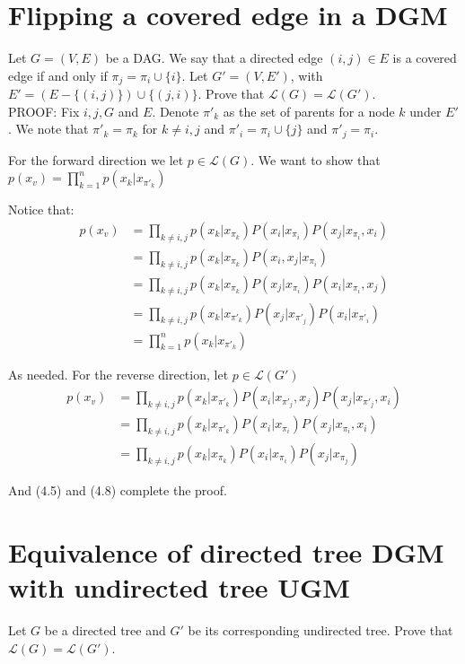 \documentclass[paper=a4, fontsize=11pt]{scrartcl} %
\numberwithin{equation}{section} %
\numberwithin{figure}{section} %
\numberwithin{table}{section} %
\begin{document}
\section{Flipping a covered edge in a DGM}
Let $G = (V, E)$ be a DAG. We say that a directed edge $(i, j) \in E$ is a covered edge if and only
if $\pi_j = \pi_i \cup \{i\}$. Let $G' = (V, E')$, with $E' = (E-\{(i, j)\}) \cup \{(j, i)\}$. Prove that $\mathcal{L}(G) = \mathcal{L}(G')$.
\\

PROOF: Fix $i,j, G$ and $E$. Denote \(\pi'_k\) as the set of parents for a node $k$ under $E'$. We note that \(\pi'_k = \pi_k\) for \(k\ne i,j\) and \(\pi'_i = \pi_i \cup \{j\}\) and \(\pi'_j = \pi_i\).

For the forward direction we let $p \in \mathcal{L}(G)$. 
We want to show that \(p(x_v)=\prod_{k=1}^{n}p(x_k|x_{\pi'_k})\)

Notice that: 
\begin{align}
p(x_v)&=\prod_{k\ne i,j}p(x_k|x_{\pi_k})P(x_i|x_{\pi_i})P(x_j|x_{\pi_i}, x_i) \\
&= \prod_{k\ne i,j}p(x_k|x_{\pi_k})P(x_i, x_j|x_{\pi_i}) \\
&= \prod_{k\ne i,j}p(x_k|x_{\pi_k})P(x_j|x_{\pi_i})P(x_i|x_{\pi_i}, x_j) \\
&= \prod_{k\ne i,j}p(x_k|x_{\pi'_k})P(x_j|x_{\pi'_j})P(x_i|x_{\pi'_i})\\
&=\prod_{k=1}^{n}p(x_k|x_{\pi'_k})
\end{align}

As needed. For the reverse direction, let $p \in \mathcal{L}(G')$
\begin{align}
p(x_v)&=\prod_{k\ne i,j}p(x_k|x_{\pi'_k})P(x_i|x_{\pi'_j}, x_j)P(x_j|x_{\pi'_j}, x_i) \\
&= \prod_{k\ne i,j}p(x_k|x_{\pi'_k})P(x_i|x_{\pi_i})P(x_j|x_{\pi_i}, x_i) \\
&= \prod_{k\ne i,j}p(x_k|x_{\pi_k})P(x_i|x_{\pi_i})P(x_j|x_{\pi_j})
\end{align}

And (4.5) and (4.8) complete the proof.

\section{Equivalence of directed tree DGM with undirected tree UGM}

Let \(G\) be a directed tree and \(G'\) be its corresponding undirected tree. Prove that $\mathcal{L}(G) = \mathcal{L}(G')$.
\\
\end{document}
